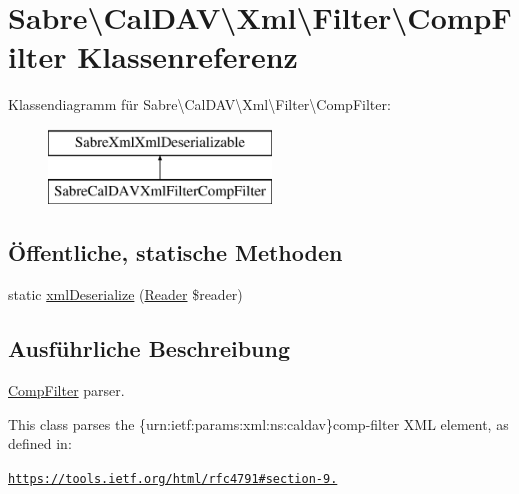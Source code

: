 \hypertarget{class_sabre_1_1_cal_d_a_v_1_1_xml_1_1_filter_1_1_comp_filter}{}\section{Sabre\textbackslash{}Cal\+D\+AV\textbackslash{}Xml\textbackslash{}Filter\textbackslash{}Comp\+Filter Klassenreferenz}
\label{class_sabre_1_1_cal_d_a_v_1_1_xml_1_1_filter_1_1_comp_filter}
Klassendiagramm für Sabre\textbackslash{}Cal\+D\+AV\textbackslash{}Xml\textbackslash{}Filter\textbackslash{}Comp\+Filter\+:\begin{figure}[H]
\begin{center}
\leavevmode
\includegraphics[height=2.000000cm]{class_sabre_1_1_cal_d_a_v_1_1_xml_1_1_filter_1_1_comp_filter}
\end{center}
\end{figure}
\subsection*{Öffentliche, statische Methoden}
\begin{DoxyCompactItemize}
\item 
static \mbox{\hyperlink{class_sabre_1_1_cal_d_a_v_1_1_xml_1_1_filter_1_1_comp_filter_ad5f79ca22d86d30c5740d95fb90a18be}{xml\+Deserialize}} (\mbox{\hyperlink{class_sabre_1_1_xml_1_1_reader}{Reader}} \$reader)
\end{DoxyCompactItemize}


\subsection{Ausführliche Beschreibung}
\mbox{\hyperlink{class_sabre_1_1_cal_d_a_v_1_1_xml_1_1_filter_1_1_comp_filter}{Comp\+Filter}} parser.

This class parses the \{urn\+:ietf\+:params\+:xml\+:ns\+:caldav\}comp-\/filter X\+ML element, as defined in\+:

\href{https://tools.ietf.org/html/rfc4791#section-9.6}{\tt https\+://tools.\+ietf.\+org/html/rfc4791\#section-\/9.}

